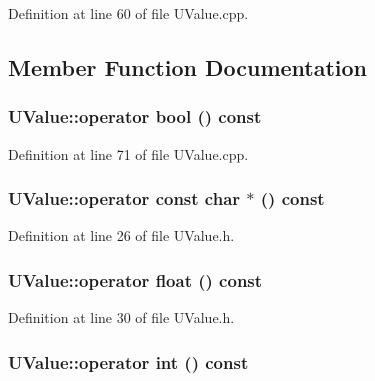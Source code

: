 Definition at line 60 of file UValue.cpp.

\subsection{Member Function Documentation}
\hypertarget{class_u_value_ad603d2607c6c215d65edce90f7de42e}{
\subsubsection[{operator bool}]{\setlength{\rightskip}{0pt plus 5cm}UValue::operator bool () const}}
\label{class_u_value_ad603d2607c6c215d65edce90f7de42e}




Definition at line 71 of file UValue.cpp.\hypertarget{class_u_value_e61e120c9e85ef30bfec09df24db3341}{
\subsubsection[{operator const char $\ast$}]{\setlength{\rightskip}{0pt plus 5cm}UValue::operator const char $\ast$ () const}}
\label{class_u_value_e61e120c9e85ef30bfec09df24db3341}




Definition at line 26 of file UValue.h.\hypertarget{class_u_value_4636a4aa31f5ced96ed7952aaa123062}{
\subsubsection[{operator float}]{\setlength{\rightskip}{0pt plus 5cm}UValue::operator float () const}}
\label{class_u_value_4636a4aa31f5ced96ed7952aaa123062}




Definition at line 30 of file UValue.h.\hypertarget{class_u_value_85746656d71d222e3439a42d2f2ca49d}{
\subsubsection[{operator int}]{\setlength{\rightskip}{0pt plus 5cm}UValue::operator int () const}}
\label{class_u_value_85746656d71d222e3439a42d2f2ca49d}




